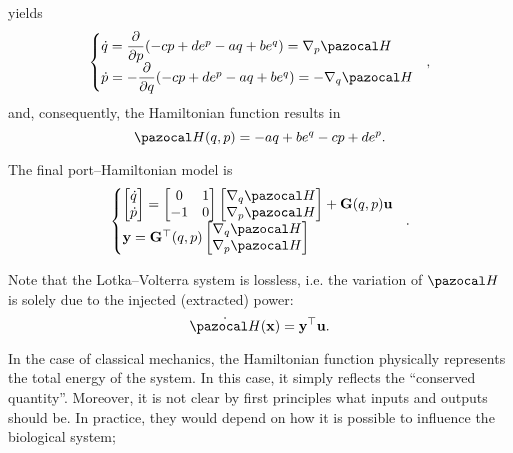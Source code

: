 \begin{exmp}
\begin{equation}
	\end{equation}
	yields
	\begin{equation*}
	\left\{ 
	\begin{matrix*}[l]
	\dot{q}  = \dfrac{\partial}{\partial p}(-cp + de^p - aq +be^q) =  {\nabla}_{p}\Ha\\
	\dot{p}  = -\dfrac{\partial}{\partial q}(-cp + de^p - aq +be^q) =  -{\nabla}_{q}\Ha
	\end{matrix*}\right.~~,
	\end{equation*}
	and, consequently, the Hamiltonian function results in
	\begin{equation}
	\Ha(q,p) = -aq + be^q - cp +de^p.
	\end{equation}
	
	The final port--Hamiltonian model is
	\begin{equation}\label{eq:LVph}
	\left\{
	\begin{matrix*}[l]
	\begin{bmatrix}	\dot{q}\\\dot{p}\end{bmatrix} 
	=
	\begin{bmatrix}0&1\\-1&0\end{bmatrix}
	\begin{bmatrix}{\nabla}_{q}\Ha\\{\nabla}_{p}\Ha\end{bmatrix}
	+
	\mathbf{G}(q,p)\ub\\
	\yb = \mathbf{G}^\top(q,p)\begin{bmatrix}{\nabla}_{q}\Ha\\{\nabla}_{p}\Ha\end{bmatrix}
	\end{matrix*}
	\right.~~.
	\end{equation}
	
	Note that the Lotka--Volterra system is lossless, i.e. the variation of $\Ha$ is solely due to the injected (extracted) power:
	\begin{equation}
	    \dot{\Ha}(\xb) = \yb^\top\ub.
	\end{equation}
	
	In the case of classical mechanics, the Hamiltonian function physically represents the total energy of the system. In this case, it simply reflects the ``conserved quantity''. Moreover, it is not clear by first principles what inputs and outputs should be. In practice, they would depend on how it is possible to influence the biological system; 
\end{exmp}
